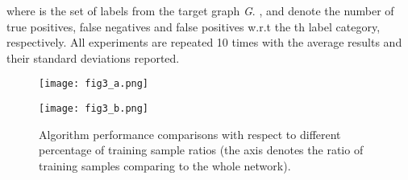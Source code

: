 \documentclass[conference]{IEEEtran}
\begin{document}
where  is the set of labels from the target graph \textit{G}. ,  and  denote the number of true positives, false negatives and false positives w.r.t the th label category, respectively. All experiments are repeated 10 times with the average results and their standard deviations reported.

\begin{figure*}[t]
\centering
\begin{minipage}[b]{0.33\linewidth}
\centering 
\texttt{[image: fig3\_a.png]}
\end{minipage}\hspace{10mm}
\begin{minipage}[b]{0.33\linewidth}
\centering 
\texttt{[image: fig3\_b.png]}
\end{minipage}\caption{Algorithm performance comparisons with respect to different percentage of training sample ratios (the axis denotes the ratio of training samples comparing to the whole network).}
\end{figure*} 
\end{document}

